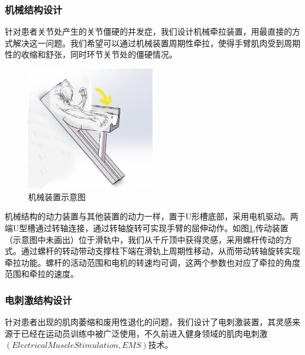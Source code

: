 \documentclass[UTF8]{ctexart}
\begin{document}
        \subsubsection{机械结构设计}
            针对患者关节处产生的关节僵硬的并发症，我们设计机械牵拉装置，用最直接的方式解决这一问题。我们希望可以通过机械装置周期性牵拉，使得手臂肌肉受到周期性的收缩和舒张，同时环节关节处的僵硬情况。
            \begin{figure}[H]
                \centering
                \includegraphics[width=0.5\textwidth]{Machine.png}
                \caption{机械装置示意图}
                \label{fig:Machine}
            \end{figure}

            机械结构的动力装置与其他装置的动力一样，置于U形槽底部，采用电机驱动。两端U型槽通过转轴连接，通过转轴旋转可实现手臂的屈伸动作。如图\ref{fig:Machine},传动装置（示意图中未画出）位于滑轨中，我们从千斤顶中获得灵感，采用螺杆传动的方式。通过螺杆的转动带动支撑柱下端在滑轨上周期性移动，从而带动转轴旋转实现牵拉功能。螺杆的活动范围和电机的转速均可调，这两个参数也对应了牵拉的角度范围和牵拉的速度。
        \subsubsection{电刺激结构设计}
            针对患者出现的肌肉萎缩和废用性退化的问题，我们设计了电刺激装置，其灵感来源于已经在运动员训练中被广泛使用，不久前进入健身领域的肌肉电刺激$(Electrical Muscle Stimulation,EMS)$技术。
\end{document}
